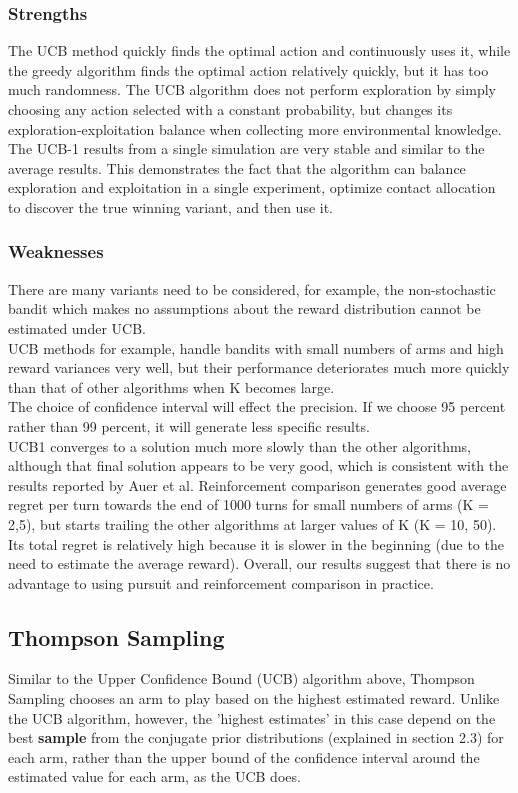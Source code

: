\subsubsection{Strengths}
The UCB method quickly finds the optimal action and continuously uses it, while the greedy algorithm finds the optimal action relatively quickly, but it has too much randomness.
The UCB algorithm does not perform exploration by simply choosing any action selected with a constant probability, but changes its exploration-exploitation balance when collecting more environmental knowledge. 
\\The UCB-1 results from a single simulation are very stable and similar to the average results. This demonstrates the fact that the algorithm can balance exploration and exploitation in a single experiment, optimize contact allocation to discover the true winning variant, and then use it.
\subsubsection{Weaknesses}
There are many variants need to be considered, for example, the non-stochastic bandit which makes no assumptions about the reward distribution cannot be estimated under UCB. 
\\UCB methods for example, handle bandits with small numbers of arms and high reward variances very well, but their performance deteriorates much more quickly than that of other algorithms when K becomes large.\citep{Kuleshov}
\\The choice of confidence interval will effect the precision. If we choose 95 percent rather than 99 percent, it will generate less specific results.
\\UCB1 converges to a solution much more slowly than the other algorithms, although that final solution appears to be very good, which is consistent with the results reported by Auer et al. Reinforcement comparison generates good average regret per turn towards the end of 1000 turns for small numbers of arms (K = 2,5), but starts trailing the other algorithms at larger values of K (K = 10, 50). Its total regret is relatively high because it is slower in the beginning (due to the need to estimate the average reward). Overall, our results suggest that there is no advantage to using pursuit and reinforcement comparison in practice. \citep{Kuleshov}
\subsection{Thompson Sampling}
Similar to the Upper Confidence Bound (UCB) algorithm above, Thompson Sampling chooses an arm to play based on the highest estimated reward. Unlike the UCB algorithm, however, the 'highest estimates' in this case depend on the best \textbf{sample} from the conjugate prior distributions (explained in section 2.3) for each arm, rather than the upper bound of the confidence interval around the estimated value for each arm, as the UCB does. 

